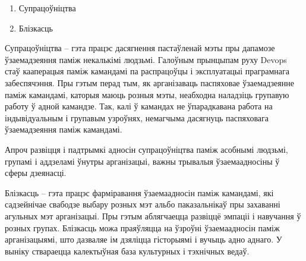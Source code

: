 \begin{enumerate}
    \item Супрацоўніцтва
    \item Блізкасць
\end{enumerate}

Супрацоўніцтва -- гэта працэс дасягнення пастаўленай мэты
пры дапамозе ўзаемадзеяння паміж некалькімі людзьмі.
Галоўным прынцыпам руху Devops стаў кааперацыя паміж
камандамі па распрацоўцы і эксплуатацыі праграмнага забеспячэння.
Пры гэтым перад тым, як арганізаваць паспяховае
ўзаемадзеянне паміж камандамі, каторыя маюць розныя мэты,
неабходна наладзіць групавую работу ў адной камандзе.
Так, калі ў камандах не ўпарадкавана работа на індывідуальным
і групавым узроўнях, немагчыма дасягнуць паспяховага ўзаемадзеяння
паміж камандамі.

Апроч развіцця і падтрымкі адносін супрацоўніцтва паміж
асобнымі людзьмі, групамі і аддзеламі ўнутры арганізацыі,
важны трывалыя ўзаемаадносіны ў сферы дзеянасці.

Блізкасць -- гэта працэс фарміравання ўзаемаадносін паміж
камандамі, які садзейнічае свабодзе выбару розных мэт альбо
паказальнікаў пры захаванні агульных мэт арганізацыі.
Пры гэтым аблягчаецца развіццё эмпаціі і навучання ў розных групах.
Блізкасць можа праяўляцца на ўзроўні ўзаемаадносін паміж
арганізацыямі, што дазваляе ім дзяліцца гісторыямі і вучыць адно
аднаго. У выніку ствараецца калектыўная база культурных і тэхнічных ведаў.

%

